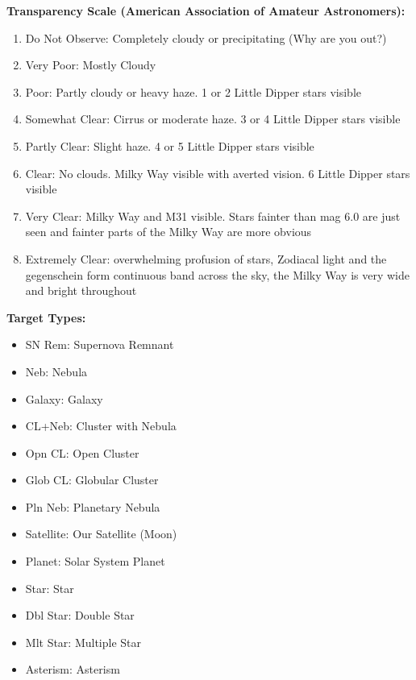 \documentclass[10pt,twoside,a4paper,english]{article}
\begin{document}
\bigskip     
{\bf Transparency Scale (American Association of Amateur Astronomers):}
\begin{enumerate}
\item Do Not Observe: Completely cloudy or precipitating (Why are you out?)
\item Very Poor: Mostly Cloudy
\item Poor: Partly cloudy or heavy haze. 1 or 2 Little Dipper stars visible
\item Somewhat Clear: Cirrus or moderate haze. 3 or 4 Little Dipper stars visible
\item Partly Clear: Slight haze. 4 or 5 Little Dipper stars visible
\item Clear: No clouds. Milky Way visible with averted vision. 6 Little Dipper stars visible
\item Very Clear: Milky Way and M31 visible. Stars fainter than mag 6.0 are just seen and fainter parts of the Milky Way are more obvious 
\item Extremely Clear: overwhelming profusion of stars, Zodiacal light and the gegenschein form continuous band across the sky, the Milky Way is very wide and bright throughout
\end{enumerate}

\bigskip
{\bf Target Types:}
\begin{itemize}
\renewcommand\labelitemi{--}
\item SN Rem: Supernova Remnant
\item Neb: Nebula
\item Galaxy: Galaxy
\item CL+Neb: Cluster with Nebula
\item Opn CL: Open Cluster
\item Glob CL: Globular Cluster
\item Pln Neb: Planetary Nebula
\item Satellite: Our Satellite (Moon)
\item Planet: Solar System Planet
\item Star: Star
\item Dbl Star: Double Star
\item Mlt Star: Multiple Star
\item Asterism: Asterism
\end{itemize}

\clearpage


\normalsize
\end{document}
